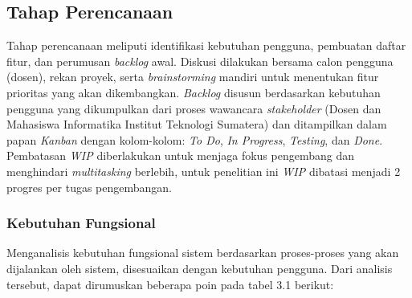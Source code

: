 \subsection{Tahap Perencanaan} \label{III.Perencanaan}
Tahap perencanaan meliputi identifikasi kebutuhan pengguna, pembuatan daftar fitur, dan perumusan \textit{backlog} awal. Diskusi dilakukan bersama calon pengguna (dosen), rekan proyek, serta \textit{brainstorming} mandiri untuk menentukan fitur prioritas yang akan dikembangkan. \textit{Backlog} disusun berdasarkan kebutuhan pengguna yang dikumpulkan dari proses wawancara \textit{stakeholder} (Dosen dan Mahasiswa Informatika Institut Teknologi Sumatera) dan ditampilkan dalam papan \textit{Kanban} dengan kolom-kolom: \textit{To Do}, \textit{In Progress}, \textit{Testing}, dan \textit{Done}. Pembatasan \textit{WIP} diberlakukan untuk menjaga fokus pengembang dan menghindari \textit{multitasking} berlebih, untuk penelitian ini \textit{WIP} dibatasi menjadi 2 progres per tugas pengembangan.

\subsubsection{Kebutuhan Fungsional}
Menganalisis kebutuhan fungsional sistem berdasarkan proses-proses yang akan dijalankan oleh sistem, disesuaikan dengan kebutuhan pengguna. Dari analisis tersebut, dapat dirumuskan beberapa poin pada tabel 3.1 berikut:


